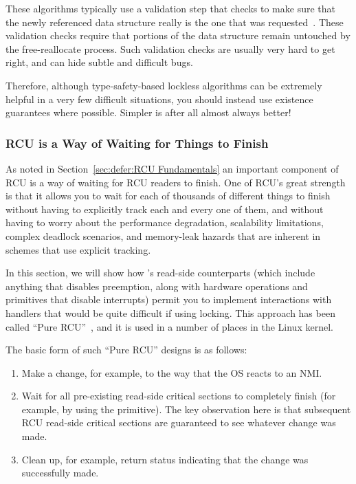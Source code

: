 These algorithms typically use a validation step that checks to make
sure that the newly referenced data structure really is the one that
was requested~\cite[Section~2.5]{LaninShasha1986TSM}.
These validation checks require that portions of the data structure
remain untouched by the free-reallocate process.
Such validation checks are usually very hard to get right, and can
hide subtle and difficult bugs.

Therefore, although type-safety-based lockless algorithms can be extremely
helpful in a very few difficult situations, you should instead use existence
guarantees where possible.
Simpler is after all almost always better!

\subsubsection{RCU is a Way of Waiting for Things to Finish}
\label{sec:defer:RCU is a Way of Waiting for Things to Finish}

As noted in Section~\ref{sec:defer:RCU Fundamentals}
an important component
of RCU is a way of waiting for RCU readers to finish.
One of
RCU's great strength is that it allows you to wait for each of
thousands of different things to finish without having to explicitly
track each and every one of them, and without having to worry about
the performance degradation, scalability limitations, complex deadlock
scenarios, and memory-leak hazards that are inherent in schemes that
use explicit tracking.

In this section, we will show how 's
read-side counterparts (which include anything that disables preemption,
along with hardware operations and
primitives that disable interrupts) permit you to implement interactions with
 handlers that would be quite difficult if using locking.
This approach has been called ``Pure RCU''~\cite{PaulEdwardMcKenneyPhD},
and it is used in a number of places in the Linux kernel.

The basic form of such ``Pure RCU'' designs is as follows:

\begin{enumerate}
\item	Make a change, for example, to the way that the OS reacts to an NMI.
\item	Wait for all pre-existing read-side critical sections to
	completely finish (for example, by using the
	 primitive).
	The key observation here is that subsequent RCU read-side critical
	sections are guaranteed to see whatever change was made.
\item	Clean up, for example, return status indicating that the
	change was successfully made.
\end{enumerate}


